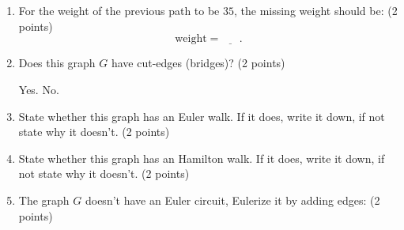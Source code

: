 \documentclass[12pt]{exam}
\begin{document}
\begin{enumerate}
\begin{enumerate}
    \vfill
    \item For the weight of the previous path to be $35$, the missing weight should be: (2 points)
    \vspace{0.5em}
    $$\text{weight}=\underline{\phantom{ans}}.$$
    \vfill
    \item Does this graph $G$ have cut-edges (bridges)? (2 points)
    \begin{checkboxes}
        \choice Yes.
        \choice No.
    \end{checkboxes}
    \vfill
    \item State whether this graph has an Euler walk. If it does, write it down, if not state why it doesn't. (2 points)
    \vspace{8em}
    \vfill
    \item State whether this graph has an Hamilton walk. If it does, write it down, if not state why it doesn't. (2 points)
    \vspace{8em}
    \vfill
    \newpage
    \item The graph $G$ doesn't have an Euler circuit, Eulerize it by adding edges: (2 points)
    \begin{figure}[h]
        \centering
    
        \begin{tikzpicture}[x=0.75pt,y=0.75pt,yscale=-1,xscale=1]
        

\end{tikzpicture}
\end{figure}
\end{enumerate}
\end{enumerate}
\end{document}
